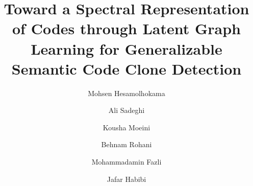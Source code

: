 \documentclass[final,5p,times,twocolumn]{elsarticle}
\theoremstyle{plain}
\begin{document}
\begin{frontmatter}



\title{Toward a Spectral Representation of Codes through Latent Graph Learning for Generalizable Semantic Code Clone Detection}


\author[mce]{Mohsen Hesamolhokama}

\author[math]{Ali Sadeghi}

\author[math]{Kousha Moeini}

\author[math]{Behnam Rohani}

\author[mce]{Mohammadamin Fazli}

\author[mce]{Jafar Habibi}

\address[mce]{Department of Computer Engineering, Sharif University of Technology, Tehran, Iran}
\address[math]{Department of Mathematical Sciences, Sharif University of Technology, Tehran, Iran}



\end{frontmatter}
\end{document}
